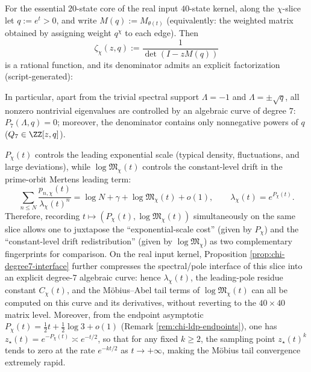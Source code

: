 \begin{proposition}\label{prop:chi-degree7-interface}
For the essential \(20\)-state core of the real input \(40\)-state kernel, along the \(\chi\)-slice let \(q:=e^t>0\), and write \(M(q):=M_{\theta(t)}\) (equivalently: the weighted matrix obtained by assigning weight \(q^{\chi}\) to each edge).
Then
\[
\zeta_\chi(z,q):=\frac{1}{\det(I-zM(q))}
\]
is a rational function, and its denominator admits an explicit factorization (script-generated):

In particular, apart from the trivial spectral support \(\Lambda=-1\) and \(\Lambda=\pm\sqrt q\), all nonzero nontrivial eigenvalues are controlled by an algebraic curve of degree \(7\): \(P_7(\Lambda,q)=0\); moreover, the denominator contains only nonnegative powers of \(q\) (\(Q_7\in\ZZ[z,q]\)).
\end{proposition}

\begin{remark}
$P_\chi(t)$ controls the leading exponential scale (typical density, fluctuations, and large deviations), while $\log\mathfrak{M}_\chi(t)$ controls the constant-level drift in the prime-orbit Mertens leading term:
\[
\sum_{n\le N}\frac{p_{n,\chi}(t)}{\lambda_\chi(t)^n}=\log N+\gamma+\log\mathfrak{M}_\chi(t)+o(1),
\qquad
\lambda_\chi(t)=e^{P_\chi(t)}.
\]
Therefore, recording $t\mapsto(P_\chi(t),\log\mathfrak{M}_\chi(t))$ simultaneously on the same slice allows one to juxtapose the ``exponential-scale cost'' (given by $P_\chi$) and the ``constant-level drift redistribution'' (given by $\log\mathfrak{M}_\chi$) as two complementary fingerprints for comparison.
On the real input kernel, Proposition \ref{prop:chi-degree7-interface} further compresses the spectral/pole interface of this slice into an explicit degree-\(7\) algebraic curve: hence \(\lambda_\chi(t)\), the leading-pole residue constant \(C_\chi(t)\), and the M\"{o}bius--Abel tail terms of \(\log\mathfrak{M}_\chi(t)\) can all be computed on this curve and its derivatives, without reverting to the \(40\times 40\) matrix level.
Moreover, from the endpoint asymptotic \(P_\chi(t)=\tfrac12t+\tfrac12\log 3+o(1)\) (Remark \ref{rem:chi-ldp-endpoints}), one has \(z_\star(t)=e^{-P_\chi(t)}\asymp e^{-t/2}\), so that for any fixed \(k\ge 2\), the sampling point \(z_\star(t)^k\) tends to zero at the rate \(e^{-kt/2}\) as \(t\to+\infty\), making the M\"{o}bius tail convergence extremely rapid.
\end{remark}

